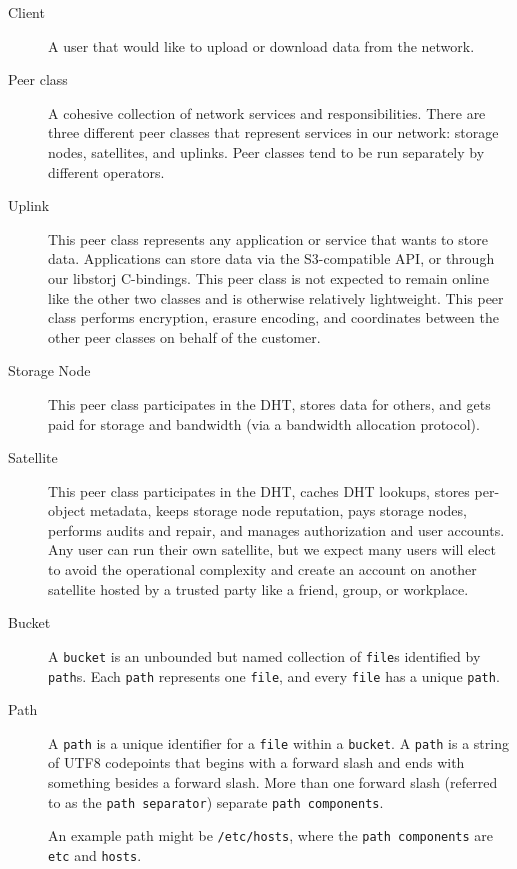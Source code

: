 \documentclass[11pt,fleqn,openany]{book}
\newcommand{\x}[1]{{\tt #1}} \newcommand{\code}[1]{{\tt #1}}
\begin{document}
\begin{description}
\item[Client] A user that would like to upload or download data from the network.

\item[Peer class] A cohesive collection of network services and
  responsibilities. There are three different peer classes that represent
  services in our network: storage nodes, satellites, and uplinks. Peer classes
  tend to be run separately by different operators.

\item[Uplink] This peer class represents any application or
  service that wants to store data. Applications can store data via the
  S3-compatible API, or through our libstorj C-bindings. This peer class
  is not expected to remain online like the other two classes and is otherwise
  relatively lightweight. This peer class performs encryption, erasure encoding,
  and coordinates between the other peer classes on behalf of the customer.

\item[Storage Node] This peer class participates in the DHT, stores data for
  others, and gets paid for storage and bandwidth (via a bandwidth allocation
  protocol).

\item[Satellite] This peer class participates in the DHT, caches
  DHT lookups, stores per-object metadata, keeps storage node reputation, pays
  storage nodes, performs audits and repair, and manages authorization and user
  accounts. Any user can run their own satellite, but we expect many users
  will elect to avoid the operational complexity and create an account on
  another satellite hosted by a trusted party like a friend, group, or
  workplace.

\item[Bucket] A \x{bucket} is an unbounded but named
collection of \x{file}s identified by \x{path}s. Each \x{path} represents one
\x{file}, and every \x{file} has a unique \x{path}.

\item[Path] A \x{path} is a unique identifier for a \x{file} within a
\x{bucket}. A \x{path} is a string of UTF8 codepoints that begins with a forward
slash and ends with something besides a forward slash. More than one forward
slash (referred to as the \x{path separator}) separate \x{path components}.

An example path might be \code{/etc/hosts}, where the \x{path components} are
\code{etc} and \code{hosts}.


\end{description}
\end{document}
